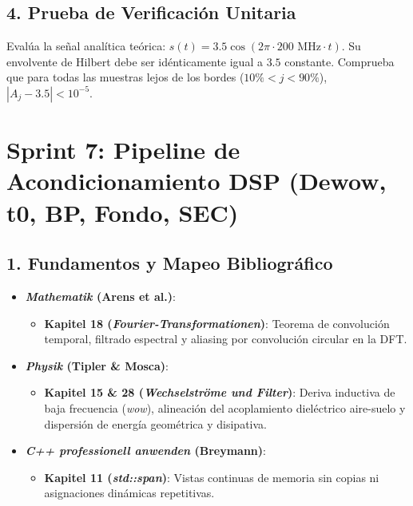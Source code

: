 \documentclass[11pt,a4paper]{article}
\begin{document}
\subsection{4. Prueba de Verificación Unitaria}
Evalúa la señal analítica teórica:
$s(t) = 3.5 \cos(2\pi \cdot 200\text{ MHz} \cdot t)$.
Su envolvente de Hilbert debe ser idénticamente igual a $3.5$ constante. Comprueba que para todas las muestras lejos de los bordes ($10\% < j < 90\%$), $|A_j - 3.5| < 10^{-5}$.

\section{Sprint 7: Pipeline de Acondicionamiento DSP (Dewow, t0, BP, Fondo, SEC)}

\subsection{1. Fundamentos y Mapeo Bibliográfico}
\begin{itemize}
    \item \textbf{\textit{Mathematik} (Arens et al.)}:
    \begin{itemize}
        \item \textbf{Kapitel 18 (\textit{Fourier-Transformationen})}: Teorema de convolución temporal, filtrado espectral y aliasing por convolución circular en la DFT.
    \end{itemize}
    \item \textbf{\textit{Physik} (Tipler \& Mosca)}:
    \begin{itemize}
        \item \textbf{Kapitel 15 \& 28 (\textit{Wechselströme und Filter})}: Deriva inductiva de baja frecuencia (\textit{wow}), alineación del acoplamiento dieléctrico aire-suelo y dispersión de energía geométrica y disipativa.
    \end{itemize}
    \item \textbf{\textit{C++ professionell anwenden} (Breymann)}:
    \begin{itemize}
        \item \textbf{Kapitel 11 (\textit{std::span})}: Vistas continuas de memoria sin copias ni asignaciones dinámicas repetitivas.
    \end{itemize}
\end{itemize}
\end{document}
